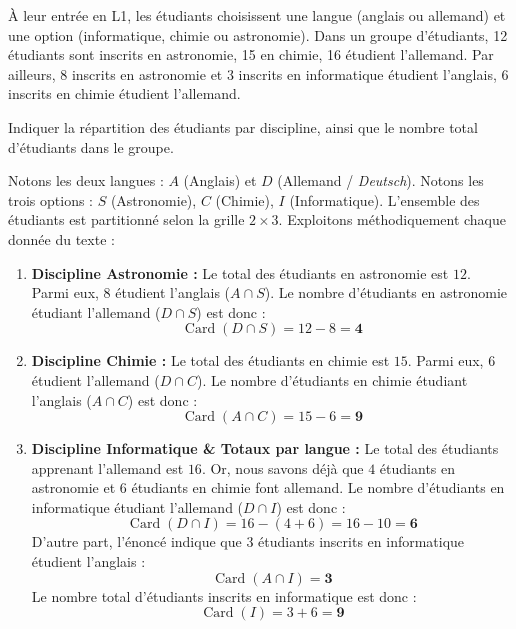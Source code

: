 \documentclass[11pt,a4paper]{article}
\begin{document}
À leur entrée en L1, les étudiants choisissent une langue (anglais ou allemand) et une option (informatique, chimie ou astronomie). Dans un groupe d'étudiants, 12 étudiants sont inscrits en astronomie, 15 en chimie, 16 étudient l'allemand. Par ailleurs, 8 inscrits en astronomie et 3 inscrits en informatique étudient l'anglais, 6 inscrits en chimie étudient l'allemand.

Indiquer la répartition des étudiants par discipline, ainsi que le nombre total d'étudiants dans le groupe.

\begin{correctionbox}
Notons les deux langues : $A$ (Anglais) et $D$ (Allemand / \emph{Deutsch}).
Notons les trois options : $S$ (Astronomie), $C$ (Chimie), $I$ (Informatique).
L'ensemble des étudiants est partitionné selon la grille $2 \times 3$.
Exploitons méthodiquement chaque donnée du texte :
\begin{enumerate}
    \item \textbf{Discipline Astronomie :}
    Le total des étudiants en astronomie est $12$. Parmi eux, $8$ étudient l'anglais ($A \cap S$).
    Le nombre d'étudiants en astronomie étudiant l'allemand ($D \cap S$) est donc :
    \[
    \operatorname{Card}(D \cap S) = 12 - 8 = \mathbf{4}
    \]

    \item \textbf{Discipline Chimie :}
    Le total des étudiants en chimie est $15$. Parmi eux, $6$ étudient l'allemand ($D \cap C$).
    Le nombre d'étudiants en chimie étudiant l'anglais ($A \cap C$) est donc :
    \[
    \operatorname{Card}(A \cap C) = 15 - 6 = \mathbf{9}
    \]

    \item \textbf{Discipline Informatique \& Totaux par langue :}
    Le total des étudiants apprenant l'allemand est $16$.
    Or, nous savons déjà que $4$ étudiants en astronomie et $6$ étudiants en chimie font allemand.
    Le nombre d'étudiants en informatique étudiant l'allemand ($D \cap I$) est donc :
    \[
    \operatorname{Card}(D \cap I) = 16 - (4 + 6) = 16 - 10 = \mathbf{6}
    \]
    D'autre part, l'énoncé indique que $3$ étudiants inscrits en informatique étudient l'anglais :
    \[
    \operatorname{Card}(A \cap I) = \mathbf{3}
    \]
    Le nombre total d'étudiants inscrits en informatique est donc :
    \[
    \operatorname{Card}(I) = 3 + 6 = \mathbf{9}
    \]
\end{enumerate}


\end{correctionbox}
\end{document}
